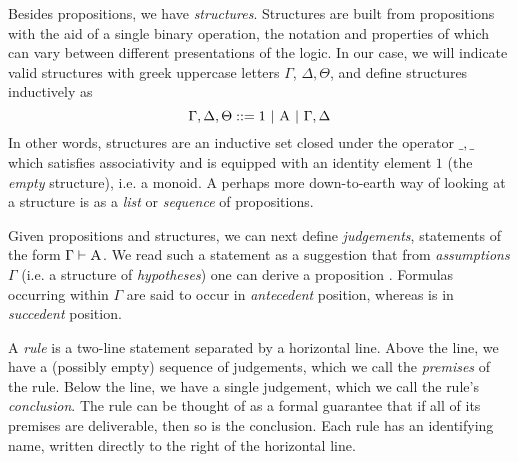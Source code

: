 Besides propositions, we have \textit{structures}. 
Structures are built from propositions with the aid of a single binary operation, the notation and properties of which can vary between different presentations of the logic.
In our case, we will indicate valid structures with greek uppercase letters $\Gamma$, $\Delta, \Theta$, and define structures inductively as 
\[
	\Gamma, \Delta, \Theta ::= 1 \ | \ \prop{A} \ | \ \Gamma, \Delta
\]
In other words, structures are an inductive set closed under the operator $\_,\_$ which satisfies associativity and is equipped with an identity element $1$ (the \textit{empty} structure), i.e. a monoid.
A perhaps more down-to-earth way of looking at a structure is as a \textit{list} or \textit{sequence} of propositions.

Given propositions and structures, we can next define \textit{judgements}, statements of the form
$\Gamma \vdash \prop{A}$.
We read such a statement as a suggestion that from \textit{assumptions} $\Gamma$ (i.e. a structure of \textit{hypotheses}) one can derive a proposition .
Formulas occurring within $\Gamma$ are said to occur in \textit{antecedent} position, whereas  is in \textit{succedent} position.

A \textit{rule} is a two-line statement separated by a horizontal line.
Above the line, we have a (possibly empty) sequence of judgements, which we call the \textit{premises} of the rule.
Below the line, we have a single judgement, which we call the rule's \textit{conclusion}.
The rule can be thought of as a formal guarantee that if all of its premises are deliverable, then so is the conclusion.
Each rule has an identifying name, written directly to the right of the horizontal line.

